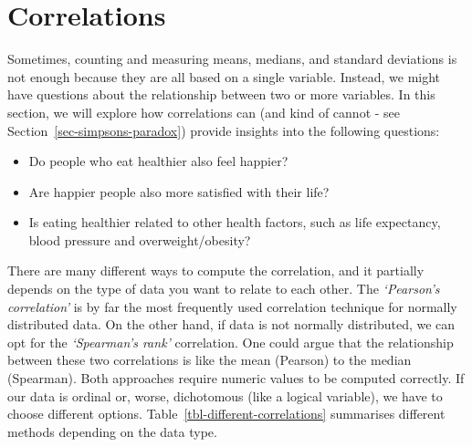 \documentclass[
  letterpaper,
]{krantz}
\begin{document}
\begin{figure}[H]


\caption{\label{fig-final-plot-outliers}}

\end{figure}%


\chapter{Correlations}\label{sec-correlations}

Sometimes, counting and measuring means, medians, and standard
deviations is not enough because they are all based on a single
variable. Instead, we might have questions about the relationship
between two or more variables. In this section, we will explore how
correlations can (and kind of cannot - see
Section~\ref{sec-simpsons-paradox}) provide insights into the following
questions:

\begin{itemize}
\item
  Do people who eat healthier also feel happier?
\item
  Are happier people also more satisfied with their life?
\item
  Is eating healthier related to other health factors, such as life
  expectancy, blood pressure and overweight/obesity?
\end{itemize}

There are many different ways to compute the correlation, and it
partially depends on the type of data you want to relate to each other.
The \emph{`Pearson's correlation'} is by far the most frequently used
correlation technique for normally distributed data. On the other hand,
if data is not normally distributed, we can opt for the
\emph{`Spearman's rank'} correlation. One could argue that the
relationship between these two correlations is like the mean (Pearson)
to the median (Spearman). Both approaches require numeric values to be
computed correctly. If our data is ordinal or, worse, dichotomous (like
a logical variable), we have to choose different options.
Table~\ref{tbl-different-correlations} summarises different methods
depending on the data type.
\end{document}

